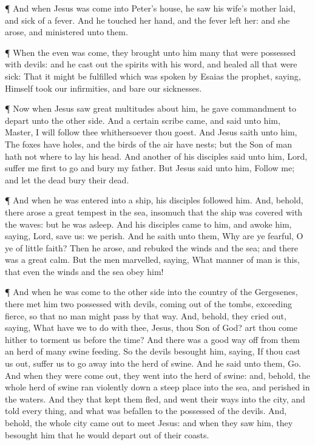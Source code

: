  ¶ And when Jesus was come into Peter's house, he saw his
wife's mother laid, and sick of a fever.  And he touched
her hand, and the fever left her: and she arose, and ministered unto
them.

 ¶ When the even was come, they brought unto him many that
were possessed with devils: and he cast out the spirits with his word,
and healed all that were sick:  That it might be fulfilled
which was spoken by Esaias the prophet, saying, Himself took our
infirmities, and bare our sicknesses.

 ¶ Now when Jesus saw great multitudes about him, he gave
commandment to depart unto the other side.  And a certain
scribe came, and said unto him, Master, I will follow thee whithersoever
thou goest.  And Jesus saith unto him, The foxes have
holes, and the birds of the air have nests; but the Son of man hath not
where to lay his head.  And another of his disciples said
unto him, Lord, suffer me first to go and bury my father. 
But Jesus said unto him, Follow me; and let the dead bury their dead.

 ¶ And when he was entered into a ship, his disciples
followed him.  And, behold, there arose a great tempest in
the sea, insomuch that the ship was covered with the waves: but he was
asleep.  And his disciples came to him, and awoke him,
saying, Lord, save us: we perish.  And he saith unto them,
Why are ye fearful, O ye of little faith? Then he arose, and rebuked the
winds and the sea; and there was a great calm.  But the men
marvelled, saying, What manner of man is this, that even the winds and
the sea obey him!

 ¶ And when he was come to the other side into the country
of the Gergesenes, there met him two possessed with devils, coming out
of the tombs, exceeding fierce, so that no man might pass by that way.
 And, behold, they cried out, saying, What have we to do
with thee, Jesus, thou Son of God? art thou come hither to torment us
before the time?  And there was a good way off from them an
herd of many swine feeding.  So the devils besought him,
saying, If thou cast us out, suffer us to go away into the herd of
swine.  And he said unto them, Go. And when they were come
out, they went into the herd of swine: and, behold, the whole herd of
swine ran violently down a steep place into the sea, and perished in the
waters.  And they that kept them fled, and went their ways
into the city, and told every thing, and what was befallen to the
possessed of the devils.  And, behold, the whole city came
out to meet Jesus: and when they saw him, they besought him that he
would depart out of their coasts.

